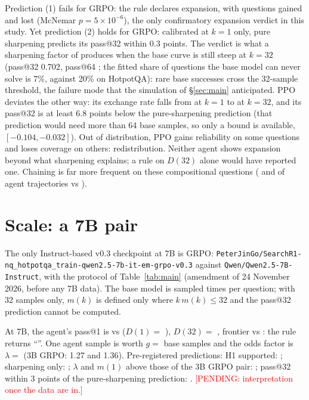 \documentclass[11pt]{article}
\newcommand{\pending}[1]{\textcolor{red}{[PENDING: #1]}}
\begin{document}
Prediction (1) fails for GRPO: the rule declares expansion, with  questions gained and  lost (McNemar $p = 5 \times 10^{-6}$), the only confirmatory expansion verdict in this study. Yet prediction (2) holds for GRPO: calibrated at $k = 1$ only, pure sharpening predicts its pass@32 within 0.3 points. The verdict is what a sharpening factor of  produces when the base curve is still steep at $k = 32$ (pass@32 0.702, pass@64 ; the fitted share of questions the base model can never solve is 7\%, against 20\% on HotpotQA): rare base successes cross the 32-sample threshold, the failure mode that the simulation of \S\ref{sec:main} anticipated. PPO deviates the other way: its exchange rate falls from  at $k = 1$ to  at $k = 32$, and its pass@32 is at least 6.8 points below the pure-sharpening prediction (that prediction would need more than 64 base samples, so only a bound is available, $[-0.104, -0.032]$). Out of distribution, PPO gains reliability on some questions and loses coverage on others: redistribution. Neither agent shows expansion beyond what sharpening explains; a rule on $D(32)$ alone would have reported one. Chaining is far more frequent on these compositional questions ( and  of agent trajectories vs ).

\section{Scale: a 7B pair}\label{sec:7b}

The only Instruct-based v0.3 checkpoint at 7B is GRPO: \texttt{PeterJinGo/SearchR1-nq\_hotpotqa\_train-qwen2.5-7b-it-em-grpo-v0.3} against \texttt{Qwen/Qwen2.5-7B-Instruct}, with the protocol of Table~\ref{tab:main} (amendment of 24 November 2026, before any 7B data). The base model is sampled  times per question; with 32 samples only, $m(k)$ is defined only where $k\,m(k) \le 32$ and the pass@32 prediction cannot be computed.

At 7B, the agent's pass@1 is  vs  ($D(1) =$ ), $D(32) =$  , frontier  vs : the rule returns ``''. One agent sample is worth $g =$   base samples and the odds factor is $\lambda =$  (3B GRPO: 1.27 and 1.36). Pre-registered predictions: H1 supported: ; sharpening only: ; $\lambda$ and $m(1)$ above those of the 3B GRPO pair: ; pass@32 within 3 points of the pure-sharpening prediction: . \pending{interpretation once the data are in.}
\end{document}
